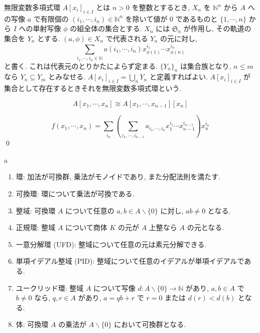 \documentclass[uplatex,dvipdfmx,a4paper,11pt]{jlreq}
\makeatletter
\theoremstyle{definition}
\renewenvironment{proof}[1][\proofname]{\par
  \normalfont
  \topsep6\p@\@plus6\p@ \trivlist
  \item[\hskip\labelsep{\bfseries #1}\@addpunct{\bfseries}]\ignorespaces\quad\par
}{%
  \qed\endtrivlist\@endpefalse
}
\renewcommand\proofname{証明}
\makeatother
\begin{document}
\begin{definition}[無限変数多項式環]
  無限変数多項式環 $A[x_i]_{i\in I}$ とは $n > 0$ を整数とするとき, $X_n$ を $\mathbb{N}^n$ から $A$ への写像 $a$ で有限個の $(i_1,\cdots,i_n)\in\mathbb{N}^n$ を除いて値が $0$ であるものと $\lbrace1,\cdots,n\rbrace$ から $I$ への単射写像 $\phi$ の組全体の集合とする. $X_n$ には $\mathfrak{S}_n$ が作用し, その軌道の集合を $Y_n$ とする. $(a,\phi)\in X_n$ で代表される $Y_n$ の元に対し,
  $$\sum_{i_1,\cdots,i_n\in\mathbb{N}}a(i_1,\cdots,i_n)x_{\phi(1)}^{i_1}\cdots x_{\phi(n)}^{i_n}$$
  と書く. これは代表元のとりかたによらず定まる. $\lbrace Y_n\rbrace_n$ は集合族となり, $n\leq m$ なら $Y_n \subseteq Y_m$ とみなせる. $A[x_i]_{i\in I} = \bigcup_n Y_n$ と定義すればよい. $A[x_i]_{i\in I}$ が集合として存在するときそれを無限変数多項式環という.
\end{definition}

\begin{theorem}
  $$
    A[x_1,\cdots,x_n]\cong A[x_1,\cdots,x_{n-1}][x_n]
  $$
\end{theorem}
\begin{proof}
  $$
    f(x_1,\cdots,x_n) = \sum_{i_n}\left(\sum_{i_1,\cdots,i_{n-1}}a_{i_1,\cdots,i_n}x_1^{i_1}\cdots x_{n-1}^{i_{n-1}}\right)x_n^{i_n}
  $$
\end{proof}

\begin{definition}[環の鎖] a
  \begin{enumerate}
    \item 環: 加法が可換群, 乗法がモノイドであり, また分配法則を満たす.
    \item 可換環: 環について乗法が可換である.
    \item 整域: 可換環 $A$ について任意の $a,b\in A\backslash\lbrace0\rbrace$ に対し, $ab\neq 0$ となる.
    \item 正規環: 整域 $A$ について商体 $K$ の元が $A$ 上整なら $A$ の元となる.
    \item 一意分解環 (UFD): 整域について任意の元は素元分解できる.
    \item 単項イデアル整域 (PID): 整域について任意のイデアルが単項イデアルである.
    \item ユークリッド環: 整域 $A$ について写像 $d:A\backslash\lbrace0\rbrace\to\mathbb{N}$ があり, $a,b\in A$ で $b\neq 0$ なら, $q,r\in A$ があり, $a = qb + r$ で $r = 0$ または $d(r)<d(b)$ となる.
    \item 体: 可換環 $A$ の乗法が $A\backslash\lbrace0\rbrace$ において可換群となる.
  \end{enumerate}
\end{definition}
\end{document}

